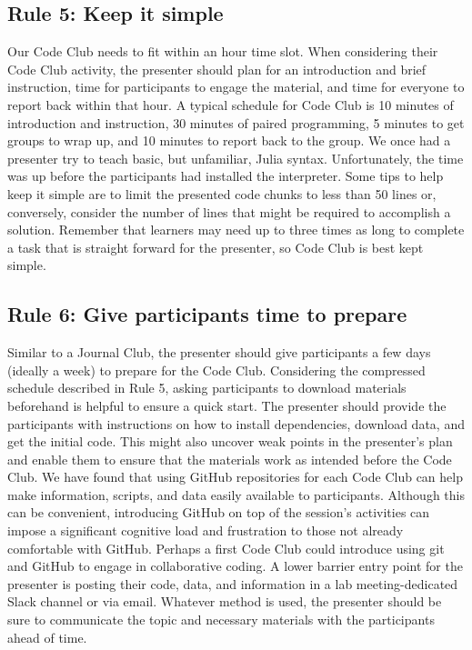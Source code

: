 \documentclass[
  11pt,
]{article}
\begin{document}
\hypertarget{rule-5-keep-it-simple}{%
\subsection{Rule 5: Keep it simple}\label{rule-5-keep-it-simple}}

Our Code Club needs to fit within an hour time slot. When considering
their Code Club activity, the presenter should plan for an introduction
and brief instruction, time for participants to engage the material, and
time for everyone to report back within that hour. A typical schedule
for Code Club is 10 minutes of introduction and instruction, 30 minutes
of paired programming, 5 minutes to get groups to wrap up, and 10
minutes to report back to the group. We once had a presenter try to
teach basic, but unfamiliar, Julia syntax. Unfortunately, the time was
up before the participants had installed the interpreter. Some tips to
help keep it simple are to limit the presented code chunks to less than
50 lines or, conversely, consider the number of lines that might be
required to accomplish a solution. Remember that learners may need up to
three times as long to complete a task that is straight forward for the
presenter, so Code Club is best kept simple.

\hypertarget{rule-6-give-participants-time-to-prepare}{%
\subsection{Rule 6: Give participants time to
prepare}\label{rule-6-give-participants-time-to-prepare}}

Similar to a Journal Club, the presenter should give participants a few
days (ideally a week) to prepare for the Code Club. Considering the
compressed schedule described in Rule 5, asking participants to download
materials beforehand is helpful to ensure a quick start. The presenter
should provide the participants with instructions on how to install
dependencies, download data, and get the initial code. This might also
uncover weak points in the presenter's plan and enable them to ensure
that the materials work as intended before the Code Club. We have found
that using GitHub repositories for each Code Club can help make
information, scripts, and data easily available to participants.
Although this can be convenient, introducing GitHub on top of the
session's activities can impose a significant cognitive load and
frustration to those not already comfortable with GitHub. Perhaps a
first Code Club could introduce using git and GitHub to engage in
collaborative coding. A lower barrier entry point for the presenter is
posting their code, data, and information in a lab meeting-dedicated
Slack channel or via email. Whatever method is used, the presenter
should be sure to communicate the topic and necessary materials with the
participants ahead of time.
\end{document}
